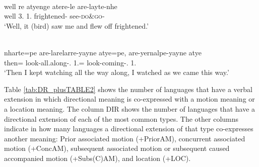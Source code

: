 \ea\label{ex:Kaytetye2}
 \\
\gll well re atyenge atere-le are-layte-nhe \\
well 3. 1. frightened- see-\textsc{do}\&\textsc{go}- \\
\glt `Well, it (bird) saw me and flew off frightened.'

\ex\label{ex:Kaytetye3}
 \\
\gll nharte=pe are-larelarre-yayne atye=pe, are-yernalpe-yayne atye \\
then= look-all.along-. 1.= look-coming-. 1. \\
\glt `Then I kept watching all the way along, I watched as we came this way.'
\z 

Table \ref{tab:DR_plusTABLE2} shows the number of languages that have a verbal extension in which directional meaning is co-expressed with a motion meaning or a location meaning. The column DIR shows the number of languages that have a directional extension of each of the most common types. The other columns indicate in how many languages a directional extension of that type co-expresses another meaning: Prior associated motion (+PriorAM), concurrent associated motion (+ConcAM), subsequent associated motion or subsequent caused accompanied motion (+Subs(C)AM), and location (+LOC).

